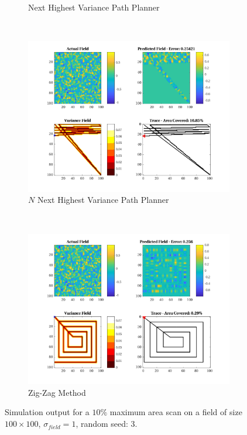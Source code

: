\begin{figure}[htb!]
\begin{subfigure}[t]{0.5\textwidth}
        \captionsetup{skip=0.10\baselineskip,size=footnotesize}
        \caption{Next Highest Variance Path Planner}
    \end{subfigure}%
    \\
    \begin{subfigure}[t]{0.5\textwidth}
        \centering
        \includegraphics[width=\linewidth]{figures/hbresults/nnhv_10p_100x100_sf_1_seed_3.png}
        \captionsetup{skip=0.10\baselineskip,size=footnotesize}
        \caption{$N$ Next Highest Variance Path Planner}
    \end{subfigure}%
    ~
    \begin{subfigure}[t]{0.5\textwidth}
        \centering
        \includegraphics[width=\linewidth]{figures/hbresults/zz_10p_100x100_sf_1_seed_3.png}
        \captionsetup{skip=0.10\baselineskip,size=footnotesize}
        \caption{Zig-Zag Method}
    \end{subfigure}%
    \captionsetup{skip=0.20\baselineskip}
    \caption{Simulation output for a $10\%$ maximum area scan on a field of size $100 \times 100$, $\sigma_{field} = 1$, random seed: 3.}
    \label{fig:sim_sigma1_p10_s3}
\end{figure}

